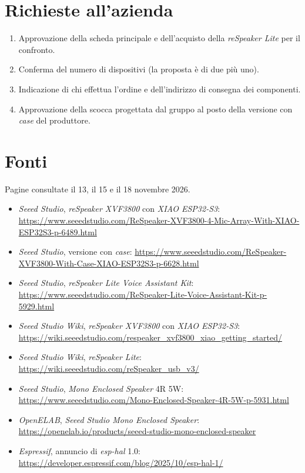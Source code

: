 \documentclass[12pt,a4paper]{article}
\newcommand{\tightlist}{\setlength{\itemsep}{1pt}\setlength{\parskip}{0pt}}
\begin{document}
\section{Richieste all'azienda}

\begin{enumerate}
\tightlist
\item Approvazione della scheda principale e dell'acquisto della \emph{reSpeaker Lite} per il confronto.
\item Conferma del numero di dispositivi (la proposta è di due più uno).
\item Indicazione di chi effettua l'ordine e dell'indirizzo di consegna dei componenti.
\item Approvazione della scocca progettata dal gruppo al posto della versione con \emph{case} del produttore.
\end{enumerate}

\section{Fonti}\label{sec:fonti}

Pagine consultate il 13, il 15 e il 18 novembre 2026.

\begin{itemize}
\tightlist
\item \emph{Seeed Studio}, \emph{reSpeaker XVF3800} con \emph{XIAO ESP32-S3}: \url{https://www.seeedstudio.com/ReSpeaker-XVF3800-4-Mic-Array-With-XIAO-ESP32S3-p-6489.html}
\item \emph{Seeed Studio}, versione con \emph{case}: \url{https://www.seeedstudio.com/ReSpeaker-XVF3800-With-Case-XIAO-ESP32S3-p-6628.html}
\item \emph{Seeed Studio}, \emph{reSpeaker Lite Voice Assistant Kit}: \url{https://www.seeedstudio.com/ReSpeaker-Lite-Voice-Assistant-Kit-p-5929.html}
\item \emph{Seeed Studio Wiki}, \emph{reSpeaker XVF3800} con \emph{XIAO ESP32-S3}: \url{https://wiki.seeedstudio.com/respeaker_xvf3800_xiao_getting_started/}
\item \emph{Seeed Studio Wiki}, \emph{reSpeaker Lite}: \url{https://wiki.seeedstudio.com/reSpeaker_usb_v3/}
\item \emph{Seeed Studio}, \emph{Mono Enclosed Speaker} 4R 5W: \url{https://www.seeedstudio.com/Mono-Enclosed-Speaker-4R-5W-p-5931.html}
\item \emph{OpenELAB}, \emph{Seeed Studio Mono Enclosed Speaker}: \url{https://openelab.io/products/seeed-studio-mono-enclosed-speaker}
\item \emph{Espressif}, annuncio di \emph{esp-hal} 1.0: \url{https://developer.espressif.com/blog/2025/10/esp-hal-1/}
\end{itemize}
\end{document}
